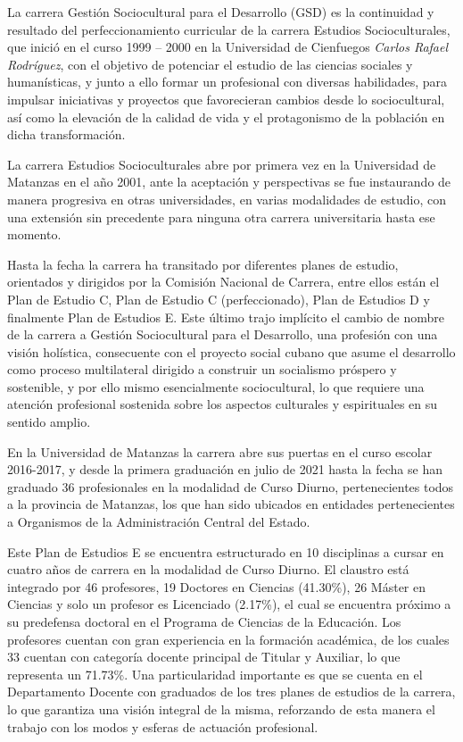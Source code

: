 La carrera Gestión Sociocultural para el Desarrollo (GSD) es la continuidad y resultado del perfeccionamiento curricular de la carrera Estudios Socioculturales, que inició en el curso 1999 – 2000 en la Universidad de Cienfuegos \emph{Carlos Rafael Rodríguez}, con el objetivo de potenciar el estudio de las ciencias sociales y humanísticas, y junto a ello formar un profesional con diversas habilidades, para impulsar iniciativas y proyectos que favorecieran cambios desde lo sociocultural, así como la elevación de la calidad de vida y el protagonismo de la población en dicha transformación.

La carrera Estudios Socioculturales abre por primera vez en la Universidad de Matanzas en el año 2001, ante la aceptación y perspectivas se fue instaurando de manera progresiva en otras universidades, en varias modalidades de estudio, con una extensión sin precedente para ninguna otra carrera universitaria hasta ese momento.

Hasta la fecha la carrera ha transitado por diferentes planes de estudio, orientados y dirigidos por la Comisión Nacional de Carrera, entre ellos están el Plan de Estudio C, Plan de Estudio C (perfeccionado), Plan de Estudios D y finalmente Plan de Estudios E. Este último trajo implícito el cambio de nombre de la carrera a Gestión Sociocultural para el Desarrollo, una profesión con una visión holística, consecuente con el proyecto social cubano que asume el desarrollo como proceso multilateral dirigido a construir un socialismo próspero y sostenible, y por ello mismo esencialmente sociocultural, lo que requiere una atención profesional sostenida sobre los aspectos culturales y espirituales en su sentido amplio. 

En la Universidad de Matanzas la carrera abre sus puertas en el curso escolar 2016-2017, y desde la primera graduación en julio de 2021 hasta la fecha se han graduado 36 profesionales en la modalidad de Curso Diurno, pertenecientes todos a la provincia de Matanzas, los que han sido ubicados en entidades pertenecientes a Organismos de la Administración Central del Estado. 

Este Plan de Estudios E se encuentra estructurado en 10 disciplinas a cursar en cuatro años de carrera en la modalidad de Curso Diurno. El claustro está integrado por 46 profesores, 19 Doctores en Ciencias (41.30\%), 26 Máster en Ciencias y solo un profesor es Licenciado (2.17\%), el cual se encuentra próximo a su predefensa doctoral en el Programa de Ciencias de la Educación. Los profesores cuentan con gran experiencia en la formación académica, de los cuales 33 cuentan con categoría docente principal de Titular y Auxiliar, lo que representa un 71.73\%. Una particularidad importante es que se cuenta en el Departamento Docente con graduados de los tres planes de estudios de la carrera, lo que garantiza una visión integral de la misma, reforzando de esta manera el trabajo con los modos y esferas de actuación profesional.

